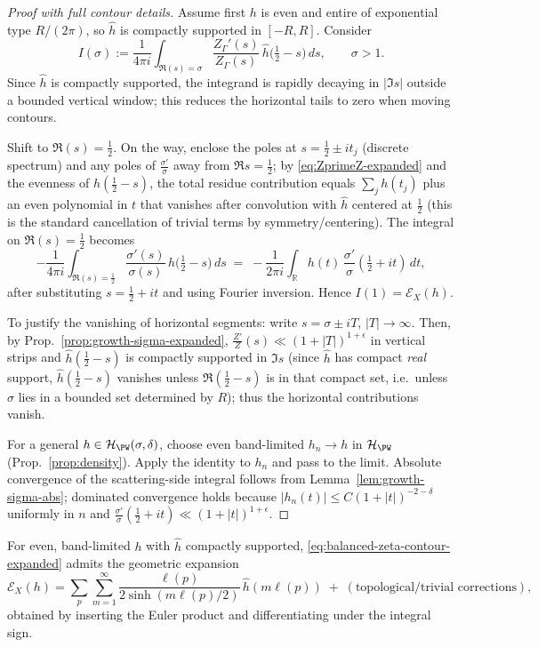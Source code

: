 \begin{proof}[Proof with full contour details]
Assume first $h$ is even and entire of exponential type $R/(2\pi)$, so $\hat h$ is compactly supported in $[-R,R]$. Consider
\[
 I(\sigma):=\frac{1}{4\pi i}\int_{\Re(s)=\sigma}\frac{Z_\Gamma'(s)}{Z_\Gamma(s)}\,\hat h\!\big(\tfrac12-s\big)\,ds,\qquad \sigma>1.
\]
Since $\hat h$ is compactly supported, the integrand is rapidly decaying in $|\Im s|$ outside a bounded vertical window; this reduces the horizontal tails to zero when moving contours.

Shift to $\Re(s)=\tfrac12$. On the way, enclose the poles at $s=\tfrac12\pm it_j$ (discrete spectrum) and any poles of $\frac{\sigma'}{\sigma}$ away from $\Re s=\tfrac12$; by \eqref{eq:ZprimeZ-expanded} and the evenness of $\hat h(\tfrac12-s)$, the total residue contribution equals $\sum_j h(t_j)$ plus an even polynomial in $t$ that vanishes after convolution with $\hat h$ centered at $\tfrac12$ (this is the standard cancellation of trivial terms by symmetry/centering). The integral on $\Re(s)=\tfrac12$ becomes
\[
  -\frac{1}{4\pi i}\int_{\Re(s)=\tfrac12}\frac{\sigma'(s)}{\sigma(s)}\,\hat h\!\big(\tfrac12-s\big)\,ds
  \;=\;-\frac{1}{2\pi i}\int_{\mathbb R} h(t)\,\frac{\sigma'}{\sigma}(\tfrac12+it)\,dt,
\]
after substituting $s=\tfrac12+it$ and using Fourier inversion. Hence $I(1)=\mathcal E_X(h)$.

To justify the vanishing of horizontal segments: write $s=\sigma\pm iT$, $|T|\to\infty$. Then, by Prop.~\ref{prop:growth-sigma-expanded}, $\frac{Z'}{Z}(s)\ll (1+|T|)^{1+\epsilon}$ in vertical strips and $\hat h(\tfrac12-s)$ is compactly supported in $\Im s$ (since $\hat h$ has compact \emph{real} support, $\hat h(\tfrac12-s)$ vanishes unless $\Re(\tfrac12-s)$ is in that compact set, i.e.\ unless $\sigma$ lies in a bounded set determined by $R$); thus the horizontal contributions vanish.

For a general $h\in\mathcal H_{\PW}(\sigma,\delta)$, choose even band-limited $h_n\to h$ in $\mathcal H_{\PW}$ (Prop.~\ref{prop:density}). Apply the identity to $h_n$ and pass to the limit. Absolute convergence of the scattering-side integral follows from Lemma~\ref{lem:growth-sigma-abs}; dominated convergence holds because $|h_n(t)|\le C(1+|t|)^{-2-\delta}$ uniformly in $n$ and $\frac{\sigma'}{\sigma}(\tfrac12+it)\ll (1+|t|)^{1+\epsilon}$.
\end{proof}

\begin{corollary}
\label{cor:geom-expansion}
For even, band-limited $h$ with $\hat h$ compactly supported, \eqref{eq:balanced-zeta-contour-expanded} admits the geometric expansion
\[
  \mathcal E_X(h) = \sum_{p}\sum_{m=1}^\infty \frac{\ell(p)}{2\sinh(m\ell(p)/2)}\,\hat h(m\ell(p)) \;+\; (\text{topological/trivial corrections}),
\]
obtained by inserting the Euler product and differentiating under the integral sign.
\end{corollary}

